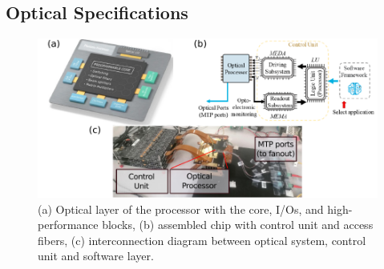 \subsection{Optical Specifications}\label{sub:optical_specifications} %

\begin{figure}[h]
	\begin{center}
		\includegraphics{figures/ch2-smart-subsystems.pdf}
	\end{center}
	\caption{(a) Optical layer of the processor with the core, I/Os, and high-performance blocks, (b) assembled chip with control unit and access fibers, (c) interconnection diagram between optical system, control unit and software layer.}
	\label{fig:ch2-smart-subsystems}
\end{figure}

